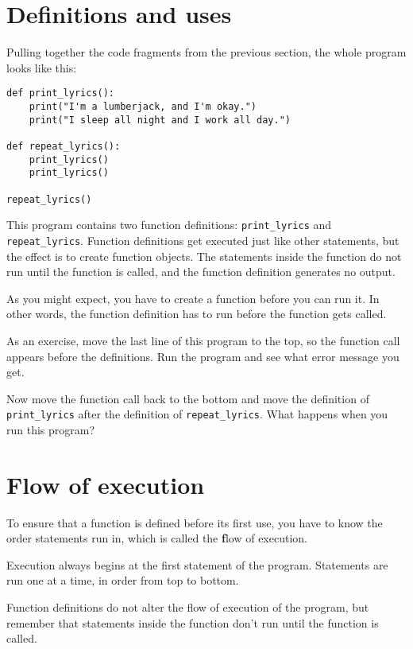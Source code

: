 \documentclass[
DIV=11,
fontsize=12,
twoside,
headinclude=false,
titlepage=firstiscover,
abstract=true,
headsepline=true,
footsepline=true,
chapterprefix=true, %
headings=big,
bibliography=totoc,%
captions=tableheading
]{scrbook}
\theoremstyle{definition}
\begin{document}
\section{Definitions and uses}

Pulling together the code fragments from the previous section, the
whole program looks like this:

\begin{lstlisting}
def print_lyrics():
    print("I'm a lumberjack, and I'm okay.")
    print("I sleep all night and I work all day.")

def repeat_lyrics():
    print_lyrics()
    print_lyrics()

repeat_lyrics()
\end{lstlisting}
%
This program contains two function definitions: \verb"print_lyrics" and
\verb"repeat_lyrics".  Function definitions get executed just like other
statements, but the effect is to create function objects.  The statements
inside the function do not run until the function is called, and
the function definition generates no output.

As you might expect, you have to create a function before you can
run it.  In other words, the function definition has to run
before the function gets called.

As an exercise, move the last line of this program
to the top, so the function call appears before the definitions. Run 
the program and see what error
message you get.

Now move the function call back to the bottom
and move the definition of \verb"print_lyrics" after the definition of
\verb"repeat_lyrics".  What happens when you run this program?


\section{Flow of execution}

To ensure that a function is defined before its first use,
you have to know the order statements run in, which is
called the {\textbf flow of execution}.

Execution always begins at the first statement of the program.
Statements are run one at a time, in order from top to bottom.

Function definitions do not alter the flow of execution of the
program, but remember that statements inside the function don't
run until the function is called.
\end{document}
